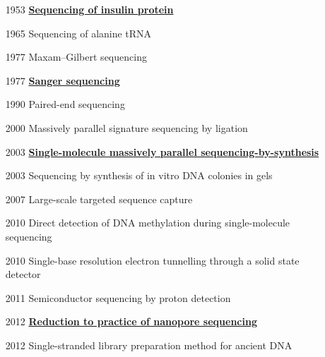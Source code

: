 \documentclass{beamer}
\begin{document}
\begin{frame}
\begin{columns}
\begin{column}{0.1\textwidth}
		\end{column}
		\begin{column}{0.9\textwidth}
			\scriptsize 
			\begin{itemize}
				\item[1953] \textbf{\underline{Sequencing of insulin protein}}
				\item[1965] Sequencing of alanine tRNA
				\item[1977] Maxam–Gilbert sequencing
				\item[1977] \textbf{\underline{Sanger sequencing}}
				\item[1990] Paired-end sequencing
				\item[2000] Massively parallel signature sequencing by ligation
				\item[2003] \textbf{\underline{Single-molecule massively parallel sequencing-by-synthesis}}
				\item[2003] Sequencing by synthesis of in vitro DNA colonies in gels
				\item[2007] Large-scale targeted sequence capture
				\item[2010] Direct detection of DNA methylation during single-molecule sequencing
				\item[2010] Single-base resolution electron tunnelling through a solid state detector
				\item[2011] Semiconductor sequencing by proton detection
				\item[2012] \underline{\textbf{Reduction to practice of nanopore sequencing}}
				\item[2012] Single-stranded library preparation method for ancient DNA
				
			\end{itemize}
		\end{column}
	\end{columns}
\end{frame}
\end{document}
